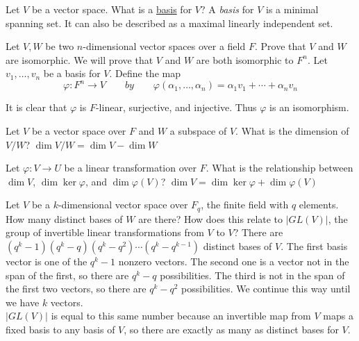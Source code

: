 \documentclass[avery5371,grid]{flashcards}
\let \phi \varphi
\begin{document}
\begin{flashcard}{Let $V$ be a vector space. What is a \underline{basis} for $V$?}
 A \emph{basis} for $V$ is a minimal spanning set. It can also be described as a maximal linearly independent set.
\end{flashcard}

\begin{flashcard}{Let $V,W$ be two $n$-dimensional vector spaces over a field $F$. Prove that $V$ and $W$ are isomorphic.}
 We will prove that $V$ and $W$ are both isomorphic to $F^n$. Let $v_1, \ldots, v_n$ be a basis for $V$. Define the map 
 $$\phi: F^n \to V \qquad by \qquad \phi(\alpha_1, \ldots, \alpha_n) = \alpha_1 v_1 + \cdots + \alpha_n v_n$$
 
 It is clear that $\phi$ is $F$-linear, surjective, and injective. Thus $\phi$ is an isomorphism.
\end{flashcard}

\begin{flashcard}{Let $V$ be a vector space over $F$ and $W$ a subspace of $V$. What is the dimension of $V/W$?}
 $\dim V/W = \dim V - \dim W$
\end{flashcard}

\begin{flashcard}{Let $\phi: V \to U$ be a linear transformation over $F$. What is the relationship between $\dim V$, $\dim \ker \phi$, and $\dim \phi(V)$?}
 $\dim V = \dim \ker \phi + \dim \phi(V)$
\end{flashcard}

\begin{flashcard}{Let $V$ be a $k$-dimensional vector space over $F_q$, the finite field with $q$ elements. How many distinct bases of $W$ are there? How does this relate to $|GL(V)|$, the group of invertible linear transformations from $V$ to $V$?}
 There are $(q^k - 1)(q^k - q)(q^k - q^2)\cdots(q^k - q^{k-1})$ distinct bases of $V$. The first basis vector is one of the $q^k - 1$ nonzero vectors. The second one is a vector not in the span of the first, so there are $q^k - q$ possibilities. The third is not in the span of the first two vectors, so there are $q^k - q^2$ possibilities. We continue this way until we have $k$ vectors.\\
 
 $|GL(V)|$ is equal to this same number because an invertible map from $V$ maps a fixed basis to any basis of $V$, so there are exactly as many as distinct bases for $V$.
\end{flashcard}
\end{document}
